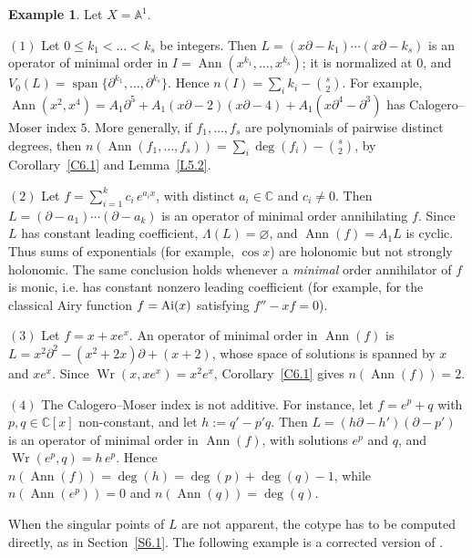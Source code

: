 \documentclass[11pt,reqno]{amsart}
\theoremstyle{plain}
\theoremstyle{definition}
\newtheorem{example}{Example}[section]
\theoremstyle{remark}
\numberwithin{equation}{section}
\newcommand{\C}{\mathbb{C}}
\newcommand{\A}{\mathbb{A}}
\newcommand{\del}{\partial}
\DeclareMathOperator{\Ann}{Ann}
\DeclareMathOperator{\Wr}{Wr}
\DeclareMathOperator{\spn}{span}
\begin{document}
\begin{example}
\label{Ex6.8}
Let $X = \A^1$.

$(1)$ Let $0 \le k_1 < \ldots < k_s$ be integers. Then $L = (x \del - k_1) \cdots (x \del -
k_s)$ is an operator of minimal order in $I = \Ann(x^{k_1}, \ldots, x^{k_s})$; it is normalized
at $0$, and $V_0(L) = \spn\{\del^{k_1}, \ldots, \del^{k_s}\}$. Hence $n(I) = \sum_i k_i -
\binom{s}{2}$. For example, $\Ann(x^2, x^4) = A_1 \del^5 + A_1 (x \del - 2)(x \del - 4) + A_1 (x
\del^4 - \del^3)$ has Calogero--Moser index $5$. More generally, if $f_1, \ldots, f_s$ are
polynomials of pairwise distinct degrees, then $n(\Ann(f_1, \ldots, f_s)) = \sum_i \deg(f_i) -
\binom{s}{2}$, by Corollary~\ref{C6.1} and Lemma~\ref{L5.2}.

$(2)$ Let $f = \sum_{i=1}^k c_i\, e^{a_i x}$, with distinct $a_i \in \C$ and $c_i \ne 0$. Then
$L = (\del - a_1) \cdots (\del - a_k)$ is an operator of minimal order annihilating $f$. Since
$L$ has constant leading coefficient, $\Lambda(L) = \varnothing$, and $\Ann(f) = A_1 L$ is cyclic.
Thus sums of exponentials (for example, $\cos x$) are holonomic but not strongly holonomic. 
The same conclusion holds whenever a {\it minimal} order annihilator of $f$ is monic, i.e. has constant nonzero leading coefficient (for example, for the classical Airy function $f = {\rm Ai}(x)$ satisfying $ f'' - x f = 0$).

$(3)$ Let $f = x + x e^x$. An operator of minimal order in $\Ann(f)$ is $L = x^2 \del^2 - (x^2 +
2x) \del + (x + 2)$, whose space of solutions is spanned by $x$ and $x e^x$. Since $\Wr(x, x e^x)
= x^2 e^x$, Corollary~\ref{C6.1} gives $n(\Ann(f)) = 2$.

$(4)$ The Calogero--Moser index is not additive. For instance, let $f = e^{p} + q$ with $p, q \in
\C[x]$ non-constant, and let $h := q' - p' q$. Then $L = (h \del - h')(\del - p')$ is an operator
of minimal order in $\Ann(f)$, with solutions $e^p$ and $q$, and $\Wr(e^p, q) = h\, e^p$. Hence
$n(\Ann(f)) = \deg(h) = \deg(p) + \deg(q) - 1$, while $n(\Ann(e^p)) = 0$ and $n(\Ann(q)) =
\deg(q)$.
\end{example}

When the singular points of $L$ are not apparent, the cotype has to be computed directly, as in
Section~\ref{S6.1}. The following example is a corrected version of \cite[Example~4.5]{Tsai}.
\end{document}

